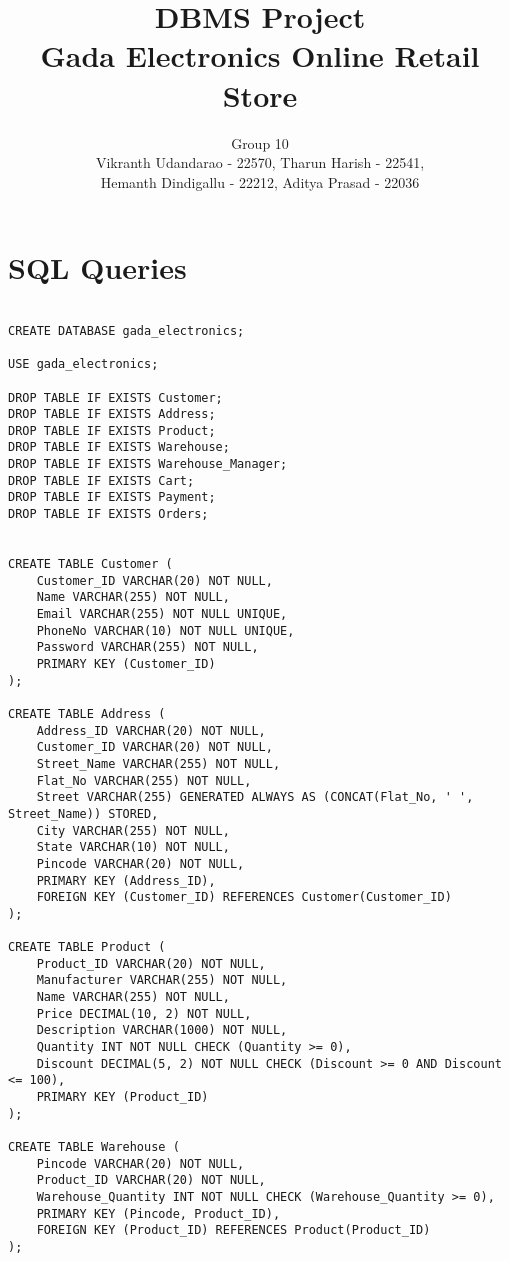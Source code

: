 \documentclass[12pt]{article}
\begin{document}
\title{\textbf{DBMS Project\\ Gada Electronics Online Retail Store}}
\author{Group 10 \\ Vikranth Udandarao - 22570, Tharun Harish - 22541, \\ Hemanth Dindigallu - 22212, Aditya Prasad - 22036}
\date{}
\maketitle

\section*{SQL Queries}

\begin{verbatim}

CREATE DATABASE gada_electronics;

USE gada_electronics;

DROP TABLE IF EXISTS Customer;
DROP TABLE IF EXISTS Address;
DROP TABLE IF EXISTS Product;
DROP TABLE IF EXISTS Warehouse;
DROP TABLE IF EXISTS Warehouse_Manager;
DROP TABLE IF EXISTS Cart;
DROP TABLE IF EXISTS Payment;
DROP TABLE IF EXISTS Orders;


CREATE TABLE Customer (
    Customer_ID VARCHAR(20) NOT NULL,
    Name VARCHAR(255) NOT NULL,
    Email VARCHAR(255) NOT NULL UNIQUE,
    PhoneNo VARCHAR(10) NOT NULL UNIQUE,
    Password VARCHAR(255) NOT NULL,
    PRIMARY KEY (Customer_ID)
);

CREATE TABLE Address (
    Address_ID VARCHAR(20) NOT NULL,
    Customer_ID VARCHAR(20) NOT NULL,
    Street_Name VARCHAR(255) NOT NULL,
    Flat_No VARCHAR(255) NOT NULL,
    Street VARCHAR(255) GENERATED ALWAYS AS (CONCAT(Flat_No, ' ', Street_Name)) STORED,
    City VARCHAR(255) NOT NULL,
    State VARCHAR(10) NOT NULL,
    Pincode VARCHAR(20) NOT NULL,
    PRIMARY KEY (Address_ID),
    FOREIGN KEY (Customer_ID) REFERENCES Customer(Customer_ID)
);

CREATE TABLE Product (
    Product_ID VARCHAR(20) NOT NULL,
    Manufacturer VARCHAR(255) NOT NULL,
    Name VARCHAR(255) NOT NULL,
    Price DECIMAL(10, 2) NOT NULL,
    Description VARCHAR(1000) NOT NULL,
    Quantity INT NOT NULL CHECK (Quantity >= 0),
    Discount DECIMAL(5, 2) NOT NULL CHECK (Discount >= 0 AND Discount <= 100),
    PRIMARY KEY (Product_ID)
);

CREATE TABLE Warehouse (
    Pincode VARCHAR(20) NOT NULL,
    Product_ID VARCHAR(20) NOT NULL,
    Warehouse_Quantity INT NOT NULL CHECK (Warehouse_Quantity >= 0),
    PRIMARY KEY (Pincode, Product_ID),
    FOREIGN KEY (Product_ID) REFERENCES Product(Product_ID)
);


\end{verbatim}
\end{document}
